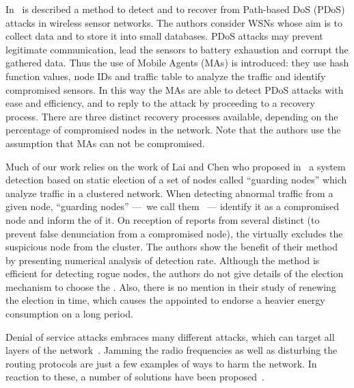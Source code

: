 In~\cite{LB09} is described a method to detect and to recover from Path-based DoS (PDoS) attacks in wireless sensor networks.
The authors consider WSNs whose aim is to collect data and to store it into small databases.
PDoS attacks may prevent legitimate communication, lead the sensors to battery exhaustion and corrupt the gathered data.
Thus the use of Mobile Agents (MAs) is introduced: they use hash function values, node IDs and traffic table to analyze the traffic and identify compromised sensors.
In this way the MAs are able to detect PDoS attacks with ease and efficiency, and to reply to the attack by proceeding to a recovery process.
There are three distinct recovery processes available, depending on the percentage of compromised nodes in the network.
Note that the authors use the assumption that MAs can not be compromised.

Much of our work relies on the work of Lai and Chen who proposed in~\cite{LC08} a system detection based on static election of a set of nodes called ``guarding nodes'' which analyze traffic in a clustered network.
When detecting abnormal traffic from a given node, ``guarding nodes'' ---~we call them \cns~--- identify it as a compromised node and inform the \ch of it.
On reception of reports from several distinct \cns (to prevent false denunciation from a compromised node), the \CH virtually excludes the suspicious node from the cluster.
The authors show the benefit of their method by presenting numerical analysis of detection rate.
Although the method is efficient for detecting rogue nodes, the authors do not give details of the election mechanism to choose the \cns.
Also, there is no mention in their study of renewing the election in time, which causes the appointed \cns to endorse a heavier energy consumption on a long period.




Denial of service attacks embraces many different attacks, which can target all layers of the network~\cite{VS10}.
Jamming the radio frequencies as well as disturbing the routing protocols are just a few examples of ways to harm the network.
In reaction to these, a number of solutions have been proposed~\cite{SSS11}.

